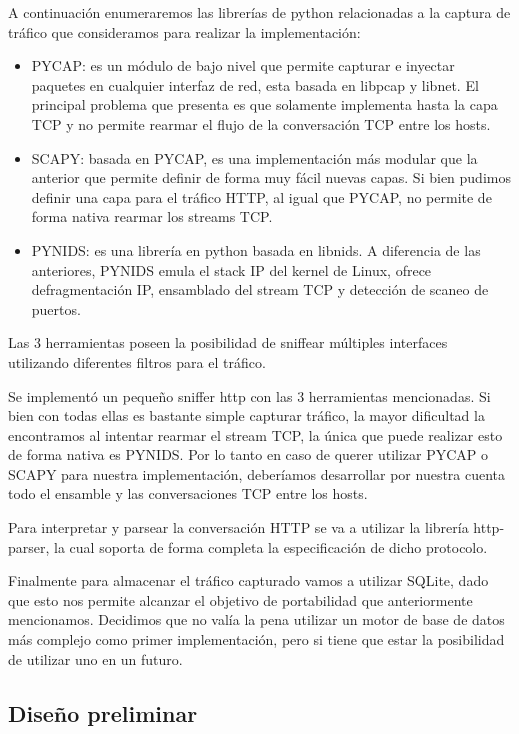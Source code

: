 A continuación enumeraremos las librerías de python relacionadas a la captura de tráfico que consideramos para realizar la implementación:

\begin{itemize}
\item PYCAP: es un módulo de bajo nivel que permite capturar e inyectar paquetes en cualquier interfaz de red, esta basada en libpcap y libnet. El principal problema que presenta es que solamente implementa hasta la capa TCP y no permite rearmar el flujo de la conversación TCP entre los hosts.
\item SCAPY: basada en PYCAP, es una implementación más modular que la anterior que permite definir de forma muy fácil nuevas capas. Si bien pudimos definir una capa para el tráfico HTTP, al igual que PYCAP, no permite de forma nativa rearmar los streams TCP.
\item PYNIDS: es una librería en python basada en libnids. A diferencia de las anteriores, PYNIDS emula el stack IP del kernel de Linux, ofrece defragmentación IP, ensamblado del stream TCP y detección de scaneo de puertos. 
\end{itemize}

Las 3 herramientas poseen la posibilidad de sniffear múltiples interfaces utilizando diferentes filtros para el tráfico. 

Se implementó un pequeño sniffer http con las 3 herramientas mencionadas. Si bien con todas ellas es bastante simple capturar tráfico, la mayor dificultad la encontramos al intentar rearmar el stream TCP, la única que puede realizar esto de forma nativa es PYNIDS. Por lo tanto en caso de querer utilizar PYCAP o SCAPY para nuestra implementación, deberíamos desarrollar por nuestra cuenta todo el ensamble y las conversaciones TCP entre los hosts. 

Para interpretar y parsear la conversación HTTP se va a utilizar la librería http-parser, la cual soporta de forma completa la especificación de dicho protocolo.

Finalmente para almacenar el tráfico capturado vamos a utilizar SQLite, dado que esto nos permite alcanzar el objetivo de portabilidad que anteriormente mencionamos. Decidimos que no valía la pena utilizar un motor de base de datos más complejo como primer implementación, pero si tiene que estar la posibilidad de utilizar uno en un futuro.

\subsection*{Diseño preliminar}

